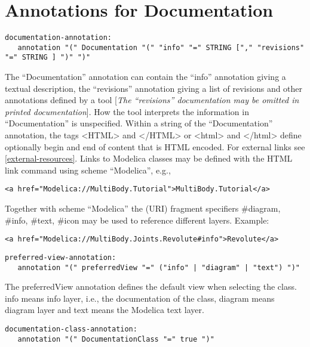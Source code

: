 \section{Annotations for Documentation}

\begin{lstlisting}[language=grammar]
documentation-annotation:
   annotation "(" Documentation "(" "info" "=" STRING ["," "revisions" "=" STRING ] ")" ")"
\end{lstlisting}
The ``Documentation'' annotation can contain the ``info'' annotation
giving a textual description, the ``revisions'' annotation giving a list
of revisions and other annotations defined by a tool {[}\emph{The
``revisions'' documentation may be omitted in printed documentation}{]}.
How the tool interprets the information in ``Documentation'' is
unspecified. Within a string of the ``Documentation'' annotation, the
tags \textless{}HTML\textgreater{} and \textless{}/HTML\textgreater{} or
\textless{}html\textgreater{} and \textless{}/html\textgreater{} define
optionally begin and end of content that is HTML encoded. For external
links see \ref{external-resources}. Links to Modelica classes may be defined with
the HTML link command using scheme ``Modelica'', e.g.,

\begin{lstlisting}[language=modelica]
<a href="Modelica://MultiBody.Tutorial">MultiBody.Tutorial</a>
\end{lstlisting}

Together with scheme ``Modelica'' the (URI) fragment specifiers
\#diagram, \#info, \#text, \#icon may be used to reference different
layers. Example:

\begin{lstlisting}[language=modelica]
<a href="Modelica://MultiBody.Joints.Revolute#info">Revolute</a>
\end{lstlisting}
\begin{lstlisting}[language=grammar]
preferred-view-annotation:
   annotation "(" preferredView "=" ("info" | "diagram" | "text") ")"
\end{lstlisting}

The preferredView annotation defines the default view when selecting the
class. info means info layer, i.e., the documentation of the class,
diagram means diagram layer and text means the Modelica text layer.
\begin{lstlisting}[language=grammar]
documentation-class-annotation:
   annotation "(" DocumentationClass "=" true ")"
\end{lstlisting}

